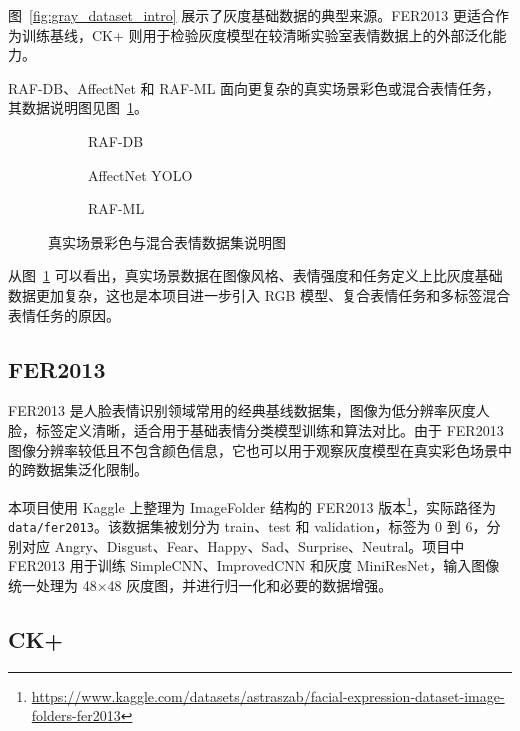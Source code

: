 \documentclass[UTF8,a4paper,12pt]{ctexart}
\newcommand{\code}[1]{\texttt{#1}}
\newcommand{\sourceurl}[1]{\footnote{\url{#1}}}
\newcommand{\figplaceholder}[1]{%
  \begin{center}
    \fbox{\parbox{0.78\textwidth}{\centering #1}}
  \end{center}
}
\begin{document}
图~\ref{fig:gray_dataset_intro} 展示了灰度基础数据的典型来源。FER2013 更适合作为训练基线，CK+ 则用于检验灰度模型在较清晰实验室表情数据上的外部泛化能力。

RAF-DB、AffectNet 和 RAF-ML 面向更复杂的真实场景彩色或混合表情任务，其数据说明图见图~\ref{fig:rgb_dataset_intro}。

\begin{figure}[H]
  \centering
  \begin{subfigure}{0.32\textwidth}
    \centering
    \figplaceholder{\rule{0pt}{1.2em}}
    \caption{RAF-DB}
  \end{subfigure}
  \hfill
  \begin{subfigure}{0.32\textwidth}
    \centering
    \figplaceholder{\rule{0pt}{1.2em}}
    \caption{AffectNet YOLO}
  \end{subfigure}
  \hfill
  \begin{subfigure}{0.32\textwidth}
    \centering
    \figplaceholder{\rule{0pt}{1.2em}}
    \caption{RAF-ML}
  \end{subfigure}
  \caption{真实场景彩色与混合表情数据集说明图}
  \label{fig:rgb_dataset_intro}
\end{figure}

从图~\ref{fig:rgb_dataset_intro} 可以看出，真实场景数据在图像风格、表情强度和任务定义上比灰度基础数据更加复杂，这也是本项目进一步引入 RGB 模型、复合表情任务和多标签混合表情任务的原因。

\subsection{FER2013}

FER2013 是人脸表情识别领域常用的经典基线数据集，图像为低分辨率灰度人脸，标签定义清晰，适合用于基础表情分类模型训练和算法对比。由于 FER2013 图像分辨率较低且不包含颜色信息，它也可以用于观察灰度模型在真实彩色场景中的跨数据集泛化限制。

本项目使用 Kaggle 上整理为 ImageFolder 结构的 FER2013 版本\sourceurl{https://www.kaggle.com/datasets/astraszab/facial-expression-dataset-image-folders-fer2013}，实际路径为 \code{data/fer2013}。该数据集被划分为 train、test 和 validation，标签为 0 到 6，分别对应 Angry、Disgust、Fear、Happy、Sad、Surprise、Neutral。项目中 FER2013 用于训练 SimpleCNN、ImprovedCNN 和灰度 MiniResNet，输入图像统一处理为 48$\times$48 灰度图，并进行归一化和必要的数据增强。

\subsection{CK+}
\end{document}
